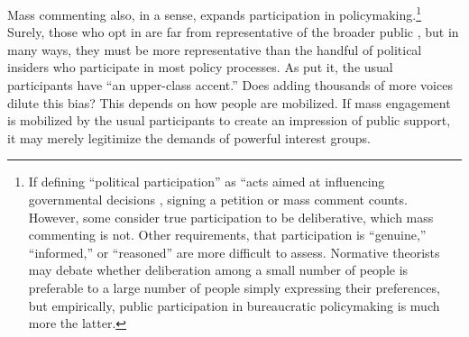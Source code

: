 Mass commenting also, in a sense, expands participation in policymaking.\footnote{
If defining ``political participation'' as ``acts aimed at influencing governmental decisions \citep[p. 2]{Verba1987}, signing a petition or mass comment counts. However, some consider true participation to be deliberative, which mass commenting is not. Other requirements, that participation is ``genuine,'' ``informed,'' or ``reasoned'' are more difficult to assess. %
Normative theorists may debate whether deliberation among a small number of people is preferable to a large number of people simply expressing their preferences, but empirically, public participation in bureaucratic policymaking is much more the latter.
} 
Surely, those who opt in are far from representative of the broader public \citep{Verba1987}, but in many ways, they must be more representative than the handful of political insiders who participate in most policy processes. As \citet{Schattschneider1942} put it, the usual participants have ``an upper-class accent.'' Does adding thousands of more voices dilute this bias? This depends on how people are mobilized. If mass engagement is mobilized by the usual participants to create an impression of public support, it may merely legitimize the demands of powerful interest groups. %






























